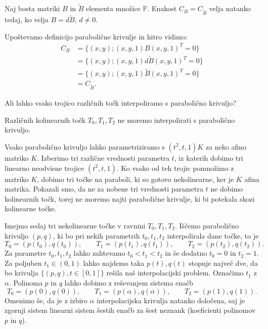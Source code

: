\documentclass[mat1]{fmfdelo}
\newcommand{\PP}{\mathbb P}
\newcommand{\al}{\alpha}
\begin{document}
\begin{posledica}\label{bb*}
Naj bosta matriki $B$ in $\widetilde{B}$ elementa množice $\PP$. Enakost $C_B = C_{\widetilde{B}}$ velja natanko tedaj, ko velja $B = d \widetilde{B}$, $d \neq 0$.
\end{posledica}

\begin{dokaz}
Upoštevamo definicijo parabolične krivulje in hitro vidimo:
\begin{align*}
C_B    &= \{ (x,y); (x,y,1) B (x, y, 1)^T = 0\} \\
	&= \{ (x,y); (x,y,1) d \widetilde{B} (x, y, 1)^T = 0\} \\
	&= \{ (x,y); (x,y,1) \widetilde{B} (x, y, 1)^T = 0\} \\
	&= C_{\widetilde{B}}.
\end{align*}
\end{dokaz}

Ali lahko vsako trojico različnih točk interpoliramo s parabolično krivuljo? 

\begin{trditev}
Različnih kolinearnih točk $T_0, T_1, T_2$ ne moremo interpolirati s parabolično krivuljo.
\end{trditev}



\begin{dokaz}
Vsako parabolično krivuljo lahko parametriziramo s $(t^2, t,1)K$ za neko afino matriko $K$. Izberimo tri različne vrednosti parametra $t$, iz katerih dobimo tri linearno neodvisne trojice $(t^2, t, 1)$. Ko vsako od teh trojic pomnožimo z matriko $K$, dobimo tri točke na paraboli, ki so gotovo nekolinearne, ker je $K$ afina matrika. Pokazali smo, da ne za nobene tri vrednosti parametra $t$ ne dobimo kolinearnih točk, torej ne moremo najti parabolične krivulje, ki bi potekala skozi kolinearne točke.
\end{dokaz}

Imejmo sedaj tri nekolinearne točke v ravnini $T_0, T_1, T_2$. Iščemo parabolično krivuljo $(p, q)$, ki bo pri nekih parametrih $t_0, t_1, t_2$ interpolirala dane točke, to je %
$$ T_0 = (p(t_0), q(t_0)), \qquad T_1 = (p(t_1), q(t_1)), \qquad T_2 = (p(t_2), q(t_2)).$$
Za parametre $t_0, t_1, t_2$ lahko zahtevamo $t_0 < t_1 < t_2$ in še dodatno $t_0 = 0$ in $t_2 = 1$. Za poljuben $t_1 \in (0,1)$  lahko najdemo taka $p(t), q(t)$ stopnje največ dve, da bo krivulja $ \{(p, q), t \in [0,1] \}$ rešila naš interpolacijski problem. Označimo $t_1$ z $\al.$  Polinoma $p$ in $q$  lahko dobimo z reševanjem sistema enačb
\begin{equation}\label{sistem}
T_0 = (p(0), q(0)), \qquad T_1 = (p(\al), q(\al)), \qquad T_2 = (p(1), q(1)).
\end{equation}
Omenimo še, da je z izbiro $\al$ interpolacijska krivulja natanko določena, saj je zgornji sistem linearni sistem šestih enačb za šest neznank (koeficienti polinomov $p$ in $q$).
\end{document}
